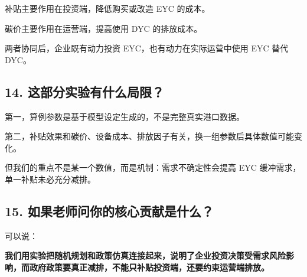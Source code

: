 \documentclass[UTF8,zihao=false,12pt]{ctexart}
\begin{document}
补贴主要作用在投资端，降低购买或改造 EYC 的成本。

碳价主要作用在运营端，提高使用 DYC 的排放成本。

两者协同后，企业既有动力投资 EYC，也有动力在实际运营中使用 EYC 替代 DYC。

\subsection*{14. 这部分实验有什么局限？}

第一，算例参数是基于模型设定生成的，不是完整真实港口数据。

第二，补贴效果和碳价、设备成本、排放因子有关，换一组参数后具体数值可能变化。

但我们的重点不是某一个数值，而是机制：需求不确定性会提高 EYC 缓冲需求，单一补贴未必充分减排。

\subsection*{15. 如果老师问你的核心贡献是什么？}

可以说：

\textbf{我们用实验把随机规划和政策仿真连接起来，说明了企业投资决策受需求风险影响，而政府政策要真正减排，不能只补贴投资端，还要约束运营端排放。}
\end{document}

